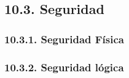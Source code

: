 \subsection{10.3. Seguridad}\label{sec:cap10_seguridad}

\subsubsection{10.3.1. Seguridad Física}\label{sec:cap10_seg_fisica}


\subsubsection{10.3.2. Seguridad lógica}\label{sec:cap10_seg_logica}

